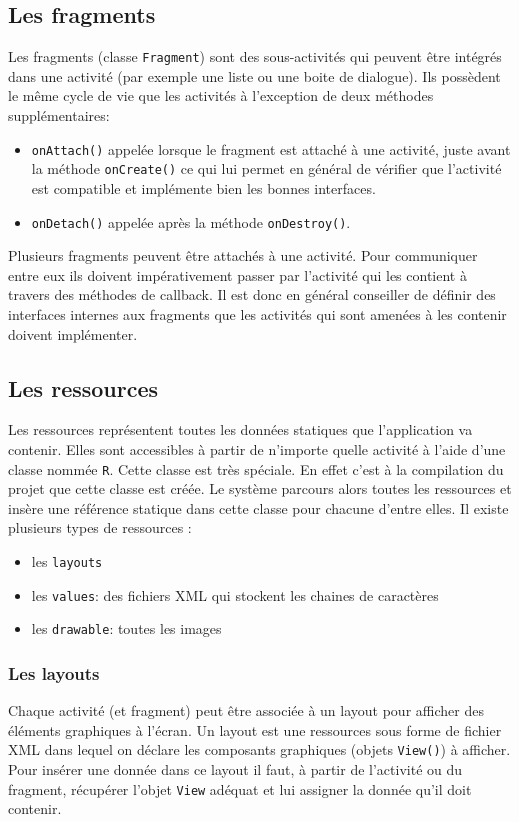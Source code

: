 \subsection{Les fragments}
Les fragments (classe \verb!Fragment!) sont des sous-activités qui peuvent être intégrés dans une activité (par exemple une liste ou une boite de dialogue). Ils possèdent le même cycle de vie que les activités à l'exception de deux méthodes supplémentaires:\bigskip
 
\begin{itemize}
 	\item \verb!onAttach()! appelée lorsque le fragment est attaché à une activité, juste avant la méthode \verb!onCreate()! ce qui lui permet en général de vérifier que l'activité est compatible et implémente bien les bonnes interfaces.
 	\item \verb!onDetach()! appelée après la méthode \verb!onDestroy()!.
\end{itemize}\bigskip

Plusieurs fragments peuvent être attachés à une activité. Pour communiquer entre eux ils doivent impérativement passer par l'activité qui les contient à travers des méthodes de callback. Il est donc en général conseiller de définir des interfaces internes aux fragments que les activités qui sont amenées à les contenir doivent implémenter. 

\subsection{Les ressources}
Les ressources représentent toutes les données statiques que l'application va contenir. Elles sont accessibles à partir de n'importe quelle activité à l'aide d'une classe nommée \verb!R!. Cette classe est très spéciale. En effet c'est à la compilation du projet que cette classe est créée. Le système parcours alors toutes les ressources et insère une référence statique dans cette classe pour chacune d'entre elles.\bigskip
Il existe plusieurs types de ressources :\bigskip

\begin{itemize}
 	\item les \verb!layouts!
 	\item les \verb!values!: des fichiers XML qui stockent les chaines de caractères
 	\item les \verb!drawable!: toutes les images
\end{itemize}\bigskip

\subsubsection{Les layouts}
Chaque activité (et fragment) peut être associée à un layout pour afficher des éléments graphiques à l'écran. Un layout est une ressources sous forme de fichier XML dans lequel on déclare les composants graphiques (objets \verb!View()!) à afficher. Pour insérer une donnée dans ce layout il faut, à partir de l'activité ou du fragment, récupérer l'objet \verb!View! adéquat et lui assigner la donnée qu'il doit contenir. \bigskip

